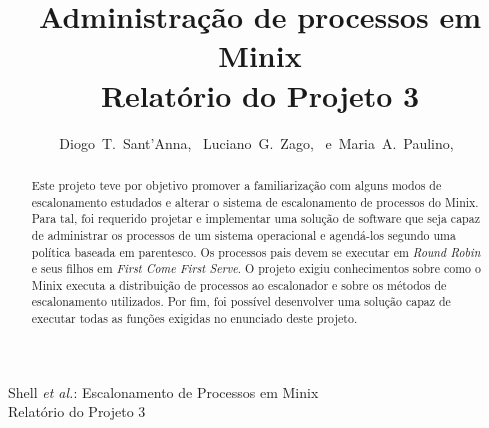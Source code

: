 \documentclass[12pt,journal,compsoc]{IEEEtran}
\begin{document}

%
{Shell \MakeLowercase{\textit{et al.}}: Escalonamento de Processos em Minix\\Relatório do Projeto 3}

\title{Administração de processos em Minix\\Relatório do Projeto 3}
\author{Diogo~T.~Sant'Anna,~
        Luciano~G.~Zago,~
        e~Maria~A.~Paulino,~
}
\maketitle

\begin{abstract}
	Este projeto teve por objetivo promover a familiarização com alguns modos de escalonamento estudados e alterar o sistema de escalonamento de processos do Minix. Para tal, foi  requerido projetar e implementar uma solução de software que seja capaz de administrar os processos de um sistema operacional e agendá-los segundo uma política baseada em parentesco. Os processos pais devem se executar em \textit{Round Robin} e seus filhos em \textit{First Come First Serve}. O projeto exigiu conhecimentos sobre como o Minix executa a distribuição de processos ao escalonador e sobre os métodos de escalonamento utilizados. Por fim, foi possível desenvolver uma solução capaz de executar todas as funções exigidas no enunciado deste projeto.
\end{abstract}

\IEEEdisplaynotcompsoctitleabstractindextext

\IEEEpeerreviewmaketitle

\end{document}
